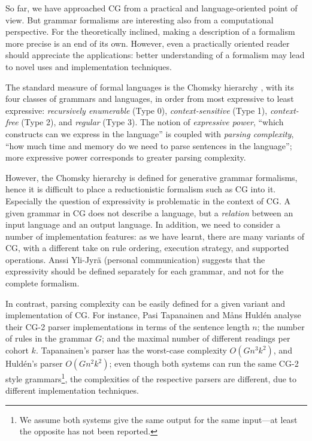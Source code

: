 So far, we have approached CG from a practical and language-oriented point of view. 
But grammar formalisms are interesting also from a computational perspective. 
For the theoretically inclined, making a description of a formalism more precise 
is an end of its own. 
However, even a practically oriented reader should appreciate the applications: 
better understanding of a formalism may lead to novel uses and implementation techniques. 

The standard measure of formal languages is the Chomsky hierarchy , with its four classes of grammars and languages, in order from most expressive to least expressive: \emph{recursively enumerable} (Type 0), \emph{context-sensitive} (Type 1), \emph{context-free} (Type 2), and \emph{regular} (Type 3). 
The notion of \emph{expressive power}, ``which constructs can we express in the language'' is coupled with \emph{parsing complexity}, ``how much time and memory do we need to parse sentences in the language''; more expressive power corresponds to greater parsing complexity. 



However, the Chomsky hierarchy is defined for generative grammar formalisms, hence it is difficult to place a reductionistic formalism such as CG into it. 
Especially the question of expressivity is problematic in the context of CG. 
A given grammar in CG does not describe a language, but a \emph{relation} between an input language and an output language. %
In addition, we need to consider a number of implementation features: 
as we have learnt, there are many variants of CG, 
with a different take on rule ordering, execution strategy, 
and supported operations. 
Anssi Yli-Jyrä (personal communication) suggests that the 
expressivity should be defined separately for each grammar, and not for the complete formalism. 

In contrast, parsing complexity can be easily defined for a given variant and implementation of CG. 
For instance, Pasi Tapanainen \cite{tapanainen1999phd} and Måns Huldén \cite{hulden2011cg_engine} analyse their CG-2 parser implementations 
in terms of the sentence length $n$; 
the number of rules in the grammar $G$; and the maximal number of different readings per cohort $k$. Tapanainen's parser has the worst-case complexity $O(Gn^3k^2)$, and Huldén's parser $O(Gn^2k^2)$;
even though both systems can run the same CG-2 style grammars\footnote{We assume both systems give the same output for the same input---at least the opposite has not been reported.}, the complexities of the respective parsers are different, due to different implementation techniques. 


